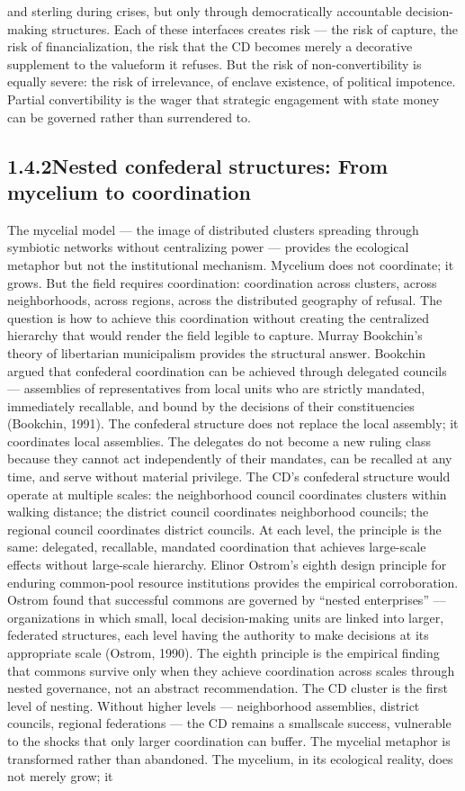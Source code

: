 and sterling during crises, but only through democratically accountable decision-making structures. Each of these interfaces creates risk — the risk of capture, the risk of financialization, the risk that the CD becomes merely a decorative supplement to the valueform it refuses. But the risk of non-convertibility is equally severe: the risk of irrelevance, of enclave existence, of political impotence. Partial convertibility is the wager that strategic engagement with state money can be governed rather than surrendered to.

\subsection{1.4.2\quad Nested confederal structures: From mycelium to coordination}

The mycelial model — the image of distributed clusters spreading through symbiotic networks without centralizing power — provides the ecological metaphor but not the institutional mechanism. Mycelium does not coordinate; it grows. But the field requires coordination: coordination across clusters, across neighborhoods, across regions, across the distributed geography of refusal. The question is how to achieve this coordination without creating the centralized hierarchy that would render the field legible to capture. Murray Bookchin’s theory of libertarian municipalism provides the structural answer. Bookchin argued that confederal coordination can be achieved through delegated councils — assemblies of representatives from local units who are strictly mandated, immediately recallable, and bound by the decisions of their constituencies (Bookchin, 1991). The confederal structure does not replace the local assembly; it coordinates local assemblies. The delegates do not become a new ruling class because they cannot act independently of their mandates, can be recalled at any time, and serve without material privilege. The CD’s confederal structure would operate at multiple scales: the neighborhood council coordinates clusters within walking distance; the district council coordinates neighborhood councils; the regional council coordinates district councils. At each level, the principle is the same: delegated, recallable, mandated coordination that achieves large-scale effects without large-scale hierarchy. Elinor Ostrom’s eighth design principle for enduring common-pool resource institutions provides the empirical corroboration. Ostrom found that successful commons are governed by “nested enterprises” — organizations in which small, local decision-making units are linked into larger, federated structures, each level having the authority to make decisions at its appropriate scale (Ostrom, 1990). The eighth principle is the empirical finding that commons survive only when they achieve coordination across scales through nested governance, not an abstract recommendation. The CD cluster is the first level of nesting. Without higher levels — neighborhood assemblies, district councils, regional federations — the CD remains a smallscale success, vulnerable to the shocks that only larger coordination can buffer. The mycelial metaphor is transformed rather than abandoned. The mycelium, in its ecological reality, does not merely grow; it 